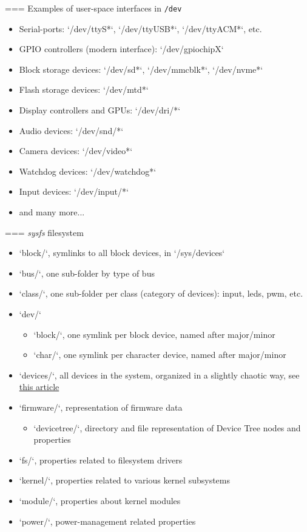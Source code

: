 === {Examples of user-space interfaces in {\tt /dev}}
  \begin{itemize}
  \item Serial-ports: `/dev/ttyS*`, `/dev/ttyUSB*`,
    `/dev/ttyACM*`, etc.
  \item GPIO controllers (modern interface): `/dev/gpiochipX`
  \item Block storage devices: `/dev/sd*`, `/dev/mmcblk*`, `/dev/nvme*`
  \item Flash storage devices: `/dev/mtd*`
  \item Display controllers and GPUs: `/dev/dri/*`
  \item Audio devices: `/dev/snd/*`
  \item Camera devices: `/dev/video*`
  \item Watchdog devices: `/dev/watchdog*`
  \item Input devices: `/dev/input/*`
  \item and many more...
  \end{itemize}


=== {{\em sysfs} filesystem}
  \begin{itemize}
  \item `block/`, symlinks to all block devices, in
    `/sys/devices`
  \item `bus/`, one sub-folder by type of bus
  \item `class/`, one sub-folder per class (category of devices):
    input, leds, pwm, etc.
  \item `dev/`
    \begin{itemize}
    \item `block/`, one symlink per block device, named after
      major/minor
    \item `char/`, one symlink per character device, named after
      major/minor
    \end{itemize}
  \item `devices/`, all devices in the system, organized in a
    slightly chaotic way, see \href{https://lwn.net/Articles/646617/}{this article}
  \item `firmware/`, representation of firmware data
    \begin{itemize}
    \item `devicetree/`, directory and file representation of
      Device Tree nodes and properties
    \end{itemize}
  \item `fs/`, properties related to filesystem drivers
  \item `kernel/`, properties related to various kernel subsystems
  \item `module/`, properties about kernel modules
  \item `power/`, power-management related properties
  \end{itemize}


